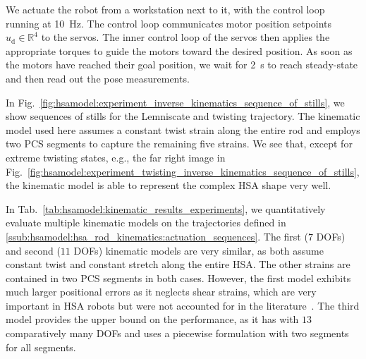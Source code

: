 We actuate the robot from a workstation next to it, with the control loop running at \SI{10}{Hz}. The control loop communicates motor position setpoints $u_\mathrm{d} \in \mathbb{R}^4$ to the servos. The inner control loop of the servos then applies the appropriate torques to guide the motors toward the desired position. As soon as the motors have reached their goal position, we wait for \SI{2}{s} to reach steady-state and then read out the pose measurements.

In Fig.~\ref{fig:hsamodel:experiment_inverse_kinematics_sequence_of_stills}, we show sequences of stills for the Lemniscate and twisting trajectory. The kinematic model used here assumes a constant twist strain along the entire rod and employs two \gls{PCS} segments to capture the remaining five strains. We see that, except for extreme twisting states, e.g., the far right image in Fig.~\ref{fig:hsamodel:experiment_twisting_inverse_kinematics_sequence_of_stills}, the kinematic model is able to represent the complex \gls{HSA} shape very well.

In Tab.~\ref{tab:hsamodel:kinematic_results_experiments}, we quantitatively evaluate multiple kinematic models on the trajectories defined in \ref{ssub:hsamodel:hsa_rod_kinematics:actuation_sequences}. 
The first ($7$ \glspl{DOF}) and second ($11$ \glspl{DOF}) kinematic models are very similar, as both assume constant twist and constant stretch along the entire \gls{HSA}. The other strains are contained in two \gls{PCS} segments in both cases. However, the first model exhibits much larger positional errors as it neglects shear strains, which are very important in \gls{HSA} robots but were not accounted for in the literature~\citep{garg2022kinematic}.
The third model provides the upper bound on the performance, as it has with $13$ comparatively many \glspl{DOF} and uses a piecewise formulation with two segments for all segments. 
